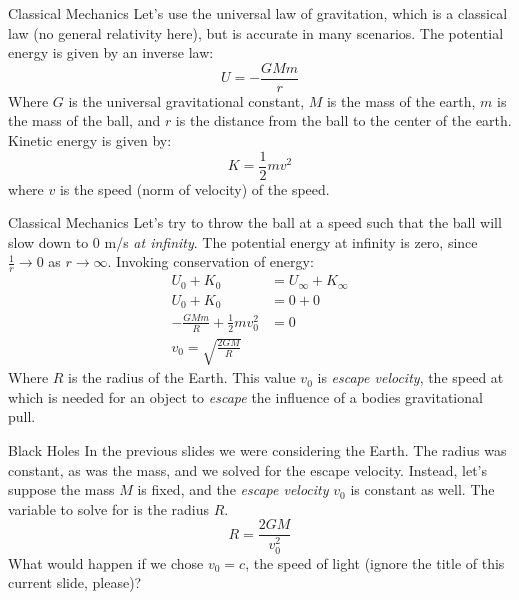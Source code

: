 \documentclass{beamer}
\begin{document}
    \begin{frame}{Classical Mechanics}
        Let's use the universal law of gravitation, which is a classical law
        (no general relativity here), but is accurate in many scenarios.
        The potential energy is given by an inverse law:
        \begin{equation}
            U=-\frac{GMm}{r}
        \end{equation}
        Where $G$ is the universal gravitational constant, $M$ is the mass of
        the earth, $m$ is the mass of the ball, and $r$ is the distance from
        the ball to the center of the earth. Kinetic energy is given by:
        \begin{equation}
            K=\frac{1}{2}mv^{2}
        \end{equation}
        where $v$ is the speed (norm of velocity) of the speed.
    \end{frame}
    \begin{frame}{Classical Mechanics}
        Let's try to throw the ball at a speed such that the ball will slow
        down to 0 m/s \textit{at infinity}. The potential energy at infinity is
        zero, since $\frac{1}{r}\rightarrow{0}$ as $r\rightarrow\infty$.
        Invoking conservation of energy:
        \begin{align}
            U_{0}+K_{0}&=U_{\infty}+K_{\infty}\\
            U_{0}+K_{0}&=0+0\\
            -\frac{GMm}{R}+\frac{1}{2}mv_{0}^{2}&=0\\
            v_{0}=\sqrt{\frac{2GM}{R}}
        \end{align}
        Where $R$ is the radius of the Earth.
        This value $v_{0}$ is \textit{escape velocity}, the speed at which is
        needed for an object to \textit{escape} the influence of a bodies
        gravitational pull.
    \end{frame}
    \begin{frame}{Black Holes}
        In the previous slides we were considering the Earth. The radius was
        constant, as was the mass, and we solved for the escape velocity.
        Instead, let's suppose the mass $M$ is
        fixed, and the \textit{escape velocity} $v_{0}$ is constant as well.
        The variable to solve for is the radius $R$.
        \begin{equation}
            R=\frac{2GM}{v_{0}^{2}}
        \end{equation}
        What would happen if we chose $v_{0}=c$, the speed of light
        (ignore the title of this current slide, please)?
    \end{frame}
\end{document}

